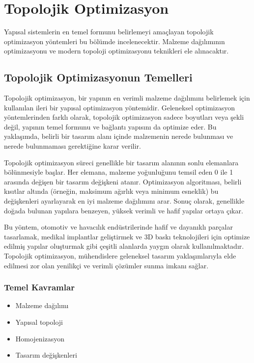 \section{Topolojik Optimizasyon}
Yapısal sistemlerin en temel formunu belirlemeyi amaçlayan topolojik optimizasyon yöntemleri bu bölümde incelenecektir. Malzeme dağılımının optimizasyonu ve modern topoloji optimizasyonu teknikleri ele alınacaktır.

\subsection{Topolojik Optimizasyonun Temelleri}
Topolojik optimizasyon, bir yapının en verimli malzeme dağılımını belirlemek için kullanılan ileri bir yapısal optimizasyon yöntemidir. Geleneksel optimizasyon yöntemlerinden farklı olarak, topolojik optimizasyon sadece boyutları veya şekli değil, yapının temel formunu ve bağlantı yapısını da optimize eder. Bu yaklaşımda, belirli bir tasarım alanı içinde malzemenin nerede bulunması ve nerede bulunmaması gerektiğine karar verilir.

Topolojik optimizasyon süreci genellikle bir tasarım alanının sonlu elemanlara bölünmesiyle başlar. Her elemana, malzeme yoğunluğunu temsil eden 0 ile 1 arasında değişen bir tasarım değişkeni atanır. Optimizasyon algoritması, belirli kısıtlar altında (örneğin, maksimum ağırlık veya minimum esneklik) bu değişkenleri ayarlayarak en iyi malzeme dağılımını arar. Sonuç olarak, genellikle doğada bulunan yapılara benzeyen, yüksek verimli ve hafif yapılar ortaya çıkar.

Bu yöntem, otomotiv ve havacılık endüstrilerinde hafif ve dayanıklı parçalar tasarlamak, medikal implantlar geliştirmek ve 3D baskı teknolojileri için optimize edilmiş yapılar oluşturmak gibi çeşitli alanlarda yaygın olarak kullanılmaktadır. Topolojik optimizasyon, mühendislere geleneksel tasarım yaklaşımlarıyla elde edilmesi zor olan yenilikçi ve verimli çözümler sunma imkanı sağlar.


\subsubsection{Temel Kavramlar}
\begin{itemize}
    \item Malzeme dağılımı 
    \item Yapısal topoloji 
    \item Homojenizasyon 
    \item Tasarım değişkenleri 
\end{itemize}

